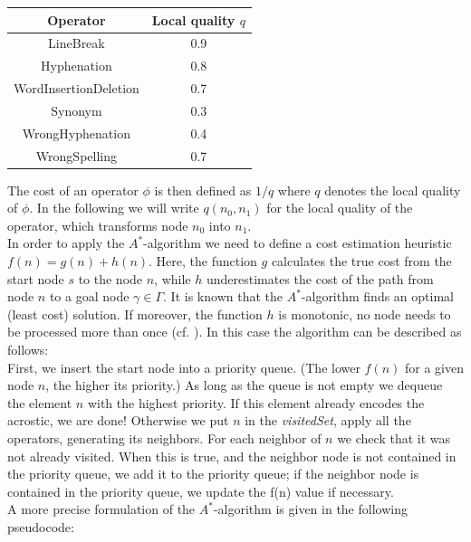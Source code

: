 \documentclass[11pt]{reportAlternative}
\begin{document}
\begin{center}

\begin{tabular}{c|c}\hline
   \textbf{Operator}           & \textbf{Local quality} $q$ \\ \hline
   LineBreak          & 0.9 \\ \hline
   Hyphenation        & 0.8 \\ \hline
   WordInsertionDeletion    & 0.7 \\ \hline
   Synonym            & 0.3 \\ \hline
   WrongHyphenation   & 0.4 \\ \hline
   WrongSpelling      & 0.7 \\ \hline
\end{tabular}

\end{center}

The cost of an operator $\phi$ is then defined as $1/q$ where $q$ denotes the local quality of $\phi$. In the following we will write $q(n_0,n_1)$ for the local quality of the operator, which transforms node $n_0$ into $n_1$.\\
In order to apply the $A^*$-algorithm we need to define a cost estimation heuristic $f(n)=g(n)+h(n)$. Here, the function $g$ calculates the true cost from the start node $s$ to
the node $n$, while $h$ underestimates the cost of the path from node $n$ to a goal node $\gamma\in\Gamma$. It is known that the $A^*$-algorithm finds an optimal (least cost) solution. If moreover, the function $h$ is monotonic, no node needs to be processed more than once (cf. \cite{AstarAlgorithm}). In this case the algorithm can be described as follows:\\

First, we insert the start node into a priority queue. (The lower $f(n)$ for a given node $n$, the higher its priority.) As long as the queue is not empty we dequeue the element $n$ with the highest priority. If this element already encodes the acrostic, we are done! Otherwise we put $n$ in the
\emph{visitedSet}, apply all the operators, generating its neighbors. For each neighbor of $n$ we check that it was not already visited. When this is true, and the neighbor node is not contained in the priority queue, we add it to the priority queue; if the neighbor node is contained in the priority queue, we update the f(n) value if necessary.\\

A more precise formulation of the $A^*$-algorithm is given in the following pseudocode:\\
\end{document}
